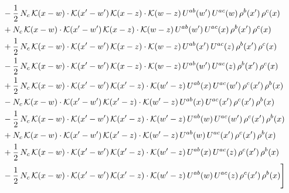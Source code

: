 \documentclass[9pt]{article}
\numberwithin{equation}{section}
\begin{document}
\begin{align}
&-\frac{1}{2}\,N_{c}\,\mathcal{K}(x-w)\cdot\mathcal{K}(x'-w')\,\mathcal{K}(x-z)\cdot\mathcal{K}(w-z)\,U^{ab}(w')\,U^{ac}(w)\,\rho^{b}(x')\,\rho^{c}(x)\notag\\
&+N_{c}\,\mathcal{K}(x-w)\cdot\mathcal{K}(x'-w')\,\mathcal{K}(x-z)\cdot\mathcal{K}(w-z)\,U^{ab}(w')\,U^{ac}(x)\,\rho^{b}(x')\,\rho^{c}(x)\notag\\
&+\frac{1}{2}\,N_{c}\,\mathcal{K}(x-w)\cdot\mathcal{K}(x'-w')\,\mathcal{K}(x-z)\cdot\mathcal{K}(w-z)\,U^{ab}(x')\,U^{ac}(z)\,\rho^{b}(x')\,\rho^{c}(x)\notag\\
&-\frac{1}{2}\,N_{c}\,\mathcal{K}(x-w)\cdot\mathcal{K}(x'-w')\,\mathcal{K}(x-z)\cdot\mathcal{K}(w-z)\,U^{ab}(w')\,U^{ac}(z)\,\rho^{b}(x')\,\rho^{c}(x)\notag\\
&+\frac{1}{2}\,N_{c}\,\mathcal{K}(x-w)\cdot\mathcal{K}(x'-w')\,\mathcal{K}(x'-z)\cdot\mathcal{K}(w'-z)\,U^{ab}(x)\,U^{ac}(w')\,\rho^{c}(x')\,\rho^{b}(x)\notag\\
&-N_{c}\,\mathcal{K}(x-w)\cdot\mathcal{K}(x'-w')\,\mathcal{K}(x'-z)\cdot\mathcal{K}(w'-z)\,U^{ab}(x)\,U^{ac}(x')\,\rho^{c}(x')\,\rho^{b}(x)\notag\\
&-\frac{1}{2}\,N_{c}\,\mathcal{K}(x-w)\cdot\mathcal{K}(x'-w')\,\mathcal{K}(x'-z)\cdot\mathcal{K}(w'-z)\,U^{ab}(w)\,U^{ac}(w')\,\rho^{c}(x')\,\rho^{b}(x)\notag\\
&+N_{c}\,\mathcal{K}(x-w)\cdot\mathcal{K}(x'-w')\,\mathcal{K}(x'-z)\cdot\mathcal{K}(w'-z)\,U^{ab}(w)\,U^{ac}(x')\,\rho^{c}(x')\,\rho^{b}(x)\notag\\
&+\frac{1}{2}\,N_{c}\,\mathcal{K}(x-w)\cdot\mathcal{K}(x'-w')\,\mathcal{K}(x'-z)\cdot\mathcal{K}(w'-z)\,U^{ab}(x)\,U^{ac}(z)\,\rho^{c}(x')\,\rho^{b}(x)\notag\\
&-\frac{1}{2}\,N_{c}\,\mathcal{K}(x-w)\cdot\mathcal{K}(x'-w')\,\mathcal{K}(x'-z)\cdot\mathcal{K}(w'-z)\,U^{ab}(w)\,U^{ac}(z)\,\rho^{c}(x')\,\rho^{b}(x)\Bigg]
\end{align}
\end{document}
